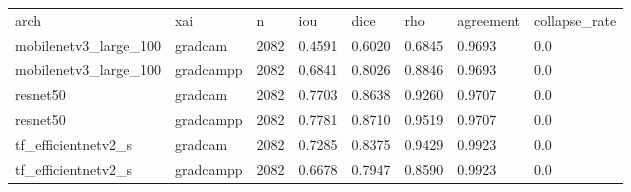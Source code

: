 \begin{tabular}{llllllll}
arch & xai & n & iou & dice & rho & agreement & collapse\_rate \\
mobilenetv3\_large\_100 & gradcam & 2082 & 0.4591 & 0.6020 & 0.6845 & 0.9693 & 0.0 \\
mobilenetv3\_large\_100 & gradcampp & 2082 & 0.6841 & 0.8026 & 0.8846 & 0.9693 & 0.0 \\
resnet50 & gradcam & 2082 & 0.7703 & 0.8638 & 0.9260 & 0.9707 & 0.0 \\
resnet50 & gradcampp & 2082 & 0.7781 & 0.8710 & 0.9519 & 0.9707 & 0.0 \\
tf\_efficientnetv2\_s & gradcam & 2082 & 0.7285 & 0.8375 & 0.9429 & 0.9923 & 0.0 \\
tf\_efficientnetv2\_s & gradcampp & 2082 & 0.6678 & 0.7947 & 0.8590 & 0.9923 & 0.0 \\
\end{tabular}
